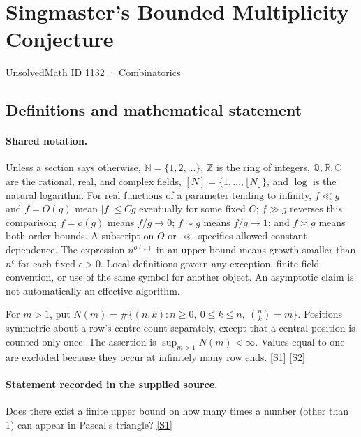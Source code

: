 \documentclass[11pt,a4paper]{article}
\newcommand{\N}{\mathbb{N}}
\newcommand{\Z}{\mathbb{Z}}
\newcommand{\Q}{\mathbb{Q}}
\newcommand{\R}{\mathbb{R}}
\newcommand{\C}{\mathbb{C}}
\newcommand{\sref}[2]{\hyperlink{source:#1:#2}{[S#2]}}
\begin{document}

\setcounter{section}{1131}

\section{Singmaster's Bounded Multiplicity Conjecture}\label{1132}

{\small\sffamily UnsolvedMath ID 1132 · Combinatorics}

\subsection{Definitions and mathematical statement}

\paragraph{Shared notation.}Unless a section says otherwise, $\N=\{1,2,\ldots\}$,
$\Z$ is the ring of integers, $\Q,\R,\C$ are the rational, real, and complex
fields, $[N]=\{1,\ldots,\lfloor N\rfloor\}$, and $\log$ is the natural
logarithm. For real functions of a parameter tending to infinity,
$f\ll g$ and $f=O(g)$ mean $|f|\leq Cg$ eventually for some fixed $C$;
$f\gg g$ reverses this comparison; $f=o(g)$ means $f/g\to0$;
$f\sim g$ means $f/g\to1$; and $f\asymp g$ means both order bounds.
A subscript on $O$ or $\ll$ specifies allowed constant dependence.
The expression $n^{o(1)}$ in an upper bound means growth smaller than
$n^\epsilon$ for each fixed $\epsilon>0$. Local definitions govern any
exception, finite-field convention, or use of the same symbol for another
object. An asymptotic claim is not automatically an effective algorithm.



For $m>1$, put $N(m)=\#\{(n,k):n\geq0,\ 0\leq k\leq n,\ \binom nk=m\}$. Positions symmetric about a row's centre count separately, except that a central position is counted only once. The assertion is $\sup_{m>1}N(m)<\infty$. Values equal to one are excluded because they occur at infinitely many row ends. \sref{1132}{1} \sref{1132}{2}

\paragraph{Statement recorded in the supplied source.}
Does there exist a finite upper bound on how many times a number (other than 1) can appear in Pascal's triangle? \sref{1132}{1}
\end{document}

